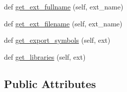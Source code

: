 \begin{DoxyCompactItemize}
def \hyperlink{classsetuptools_1_1__distutils_1_1command_1_1build__ext_1_1build__ext_a5eab440ef8685699c673219c41d86d1f}{get\+\_\+ext\+\_\+fullname} (self, ext\+\_\+name)
\item 
def \hyperlink{classsetuptools_1_1__distutils_1_1command_1_1build__ext_1_1build__ext_af6138fb9dd87086f6032e8ac24789d11}{get\+\_\+ext\+\_\+filename} (self, ext\+\_\+name)
\item 
def \hyperlink{classsetuptools_1_1__distutils_1_1command_1_1build__ext_1_1build__ext_ac8bf4a4568989941cfc5da8f85011fbc}{get\+\_\+export\+\_\+symbols} (self, ext)
\item 
def \hyperlink{classsetuptools_1_1__distutils_1_1command_1_1build__ext_1_1build__ext_aa16981011f122a07b498a2ec3e14dec0}{get\+\_\+libraries} (self, ext)
\end{DoxyCompactItemize}
\subsection*{Public Attributes}
